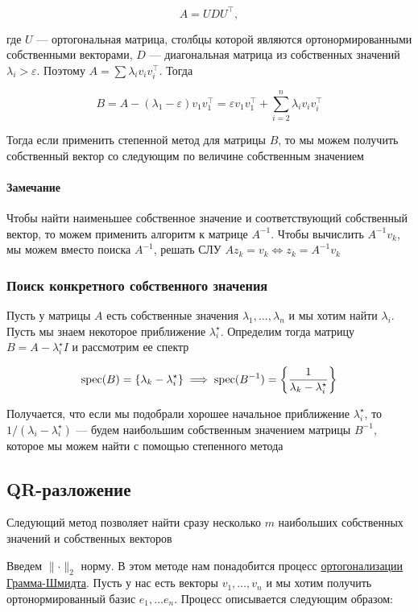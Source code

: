\[
A = U D U^{\top},
\]

где $U$ --- ортогональная матрица, столбцы которой являются ортонормированными собственными векторами, $D$ --- диагональная матрица из собственных значений $\lambda_i > \varepsilon$. Поэтому $A = \sum \lambda_i v_i v_i^{\top}$. Тогда

\[
B = A - (\lambda_1 - \varepsilon) v_1 v_1^{\top} = \varepsilon v_1 v_1^{\top} + \sum\limits_{i = 2}^n \lambda_i v_i v_i^{\top}
\]

Тогда если применить степенной метод для матрицы $B$, то мы можем получить собственный вектор со следующим по величине собственным значением

\paragraph{Замечание} Чтобы найти наименьшее собственное значение и соответствующий собственный вектор, то можем применить алгоритм к матрице $A^{-1}$. Чтобы вычислить $A^{-1} v_k$, мы можем вместо поиска $A^{-1}$, решать СЛУ $Az_k = v_k \iff z_k = A^{-1} v_k$

\subsubsection*{Поиск конкретного собственного значения}

Пусть у матрицы $A$ есть собственные значения $\lambda_1, \ldots, \lambda_n$ и мы хотим найти $\lambda_i$. Пусть мы знаем некоторое приближение $\lambda_i^{\star}$. Определим тогда матрицу $B = A - \lambda_i^{\star} I$ и рассмотрим ее спектр

\[
\operatorname{spec}(B) = \left\{ \lambda_k - \lambda_i^{\star} \right\} \implies \operatorname{spec}(B^{-1}) = \left\{ \frac{1}{\lambda_k - \lambda_i^{\star}} \right\}
\]

Получается, что если мы подобрали хорошее начальное приближение $\lambda_i^{\star}$, то $1 / (\lambda_i - \lambda_i^{\star})$ --- будем наибольшим собственным значением матрицы $B^{-1}$, которое мы можем найти с помощью степенного метода

\subsection{QR-разложение}

Следующий метод позволяет найти сразу несколько $m$ наибольших собственных значений и собственных векторов

Введем $\lVert \cdot \rVert_{2}$ норму. В этом методе нам понадобится процесс \href{https://en.wikipedia.org/wiki/Gram%E2%80%93Schmidt_process}{ортогонализации Грамма-Шмидта}. Пусть у нас есть векторы $v_1, \ldots, v_n$ и мы хотим получить ортонормированный базис $e_1, \ldots e_n$. Процесс описывается следующим образом:

